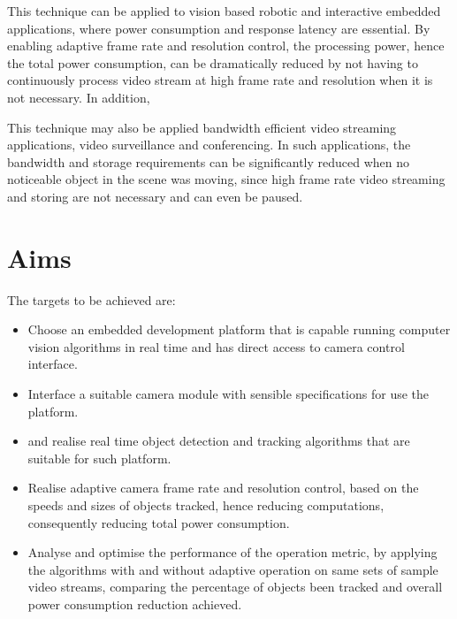 \iffalse
Example applications, can be multiple.
e.g. Video conference.
\fi

This technique can be applied to vision based robotic and interactive embedded applications, where power consumption and response latency are essential. By enabling adaptive frame rate and resolution control, the processing power, hence the total power consumption, can be dramatically reduced by not having to continuously process video stream at high frame rate and resolution when it is not necessary. In addition, 

This technique may also be applied  bandwidth efficient video streaming applications,  video surveillance and conferencing. In such applications, the bandwidth and storage requirements can be significantly reduced when no noticeable object in the scene was moving, since high frame rate video streaming and storing are not necessary and can even be paused.

\section{Aims}

\iffalse
Metric: power consumption vs accuracy?
What have done?
\fi

\iffalse
The aim of this project was to investigate ways to reduce overall power consumption of camera based real-time object detection and tracking applications, by applying feedback control of the camera module based on previous tracking results and utilising existing camera hardware capabilities including down sampling and cropping instead of software algorithms, while keeping a sensible accuracy. By doing so the average computation time would be dramatically reduced, hence reducing the overall power consumption.
\fi

The targets to be achieved are:

\begin{itemize}
	\item Choose an embedded development platform that is capable  running computer vision algorithms in real time and has direct access to camera control interface.
	\item Interface a suitable camera module with sensible specifications for use  the platform.
	\item {} and realise real time object detection and tracking algorithms that are suitable for such platform.
	\item Realise adaptive camera frame rate and resolution control, based on the speeds and sizes of objects tracked, hence reducing computations, consequently reducing total power consumption.
	\item Analyse and optimise the performance of the operation metric, by applying the algorithms with and without adaptive operation on same sets of sample video streams, comparing the percentage of objects been tracked and overall power consumption reduction achieved.
\end{itemize}

